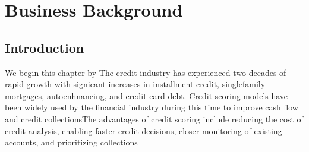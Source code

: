 %
%
%
%

\chapter{Business Background}\label{C.Business.Background}

\section{Introduction}\label{S.intro2}

We begin this chapter by The credit industry has experienced two decades of rapid growth with signicant increases in installment credit, singlefamily mortgages, autoenhnancing, and credit card debt. Credit scoring models have been widely used by the financial industry during this time to improve cash flow and credit collectionsThe advantages of credit scoring include reducing the cost of credit analysis, enabling faster credit decisions, closer monitoring of existing accounts, and prioritizing collections
 